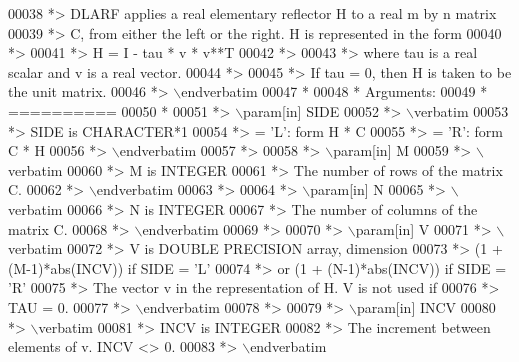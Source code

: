 \begin{DoxyCode}
00038 \textcolor{comment}{*> DLARF applies a real elementary reflector H to a real m by n matrix}
00039 \textcolor{comment}{*> C, from either the left or the right. H is represented in the form}
00040 \textcolor{comment}{*>}
00041 \textcolor{comment}{*>       H = I - tau * v * v**T}
00042 \textcolor{comment}{*>}
00043 \textcolor{comment}{*> where tau is a real scalar and v is a real vector.}
00044 \textcolor{comment}{*>}
00045 \textcolor{comment}{*> If tau = 0, then H is taken to be the unit matrix.}
00046 \textcolor{comment}{*> \(\backslash\)endverbatim}
00047 \textcolor{comment}{*}
00048 \textcolor{comment}{*  Arguments:}
00049 \textcolor{comment}{*  ==========}
00050 \textcolor{comment}{*}
00051 \textcolor{comment}{*> \(\backslash\)param[in] SIDE}
00052 \textcolor{comment}{*> \(\backslash\)verbatim}
00053 \textcolor{comment}{*>          SIDE is CHARACTER*1}
00054 \textcolor{comment}{*>          = 'L': form  H * C}
00055 \textcolor{comment}{*>          = 'R': form  C * H}
00056 \textcolor{comment}{*> \(\backslash\)endverbatim}
00057 \textcolor{comment}{*>}
00058 \textcolor{comment}{*> \(\backslash\)param[in] M}
00059 \textcolor{comment}{*> \(\backslash\)verbatim}
00060 \textcolor{comment}{*>          M is INTEGER}
00061 \textcolor{comment}{*>          The number of rows of the matrix C.}
00062 \textcolor{comment}{*> \(\backslash\)endverbatim}
00063 \textcolor{comment}{*>}
00064 \textcolor{comment}{*> \(\backslash\)param[in] N}
00065 \textcolor{comment}{*> \(\backslash\)verbatim}
00066 \textcolor{comment}{*>          N is INTEGER}
00067 \textcolor{comment}{*>          The number of columns of the matrix C.}
00068 \textcolor{comment}{*> \(\backslash\)endverbatim}
00069 \textcolor{comment}{*>}
00070 \textcolor{comment}{*> \(\backslash\)param[in] V}
00071 \textcolor{comment}{*> \(\backslash\)verbatim}
00072 \textcolor{comment}{*>          V is DOUBLE PRECISION array, dimension}
00073 \textcolor{comment}{*>                     (1 + (M-1)*abs(INCV)) if SIDE = 'L'}
00074 \textcolor{comment}{*>                  or (1 + (N-1)*abs(INCV)) if SIDE = 'R'}
00075 \textcolor{comment}{*>          The vector v in the representation of H. V is not used if}
00076 \textcolor{comment}{*>          TAU = 0.}
00077 \textcolor{comment}{*> \(\backslash\)endverbatim}
00078 \textcolor{comment}{*>}
00079 \textcolor{comment}{*> \(\backslash\)param[in] INCV}
00080 \textcolor{comment}{*> \(\backslash\)verbatim}
00081 \textcolor{comment}{*>          INCV is INTEGER}
00082 \textcolor{comment}{*>          The increment between elements of v. INCV <> 0.}
00083 \textcolor{comment}{*> \(\backslash\)endverbatim}

\end{DoxyCode}
